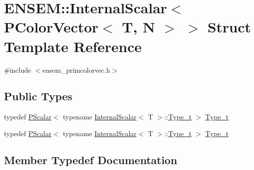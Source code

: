 \hypertarget{structENSEM_1_1InternalScalar_3_01PColorVector_3_01T_00_01N_01_4_01_4}{}\section{E\+N\+S\+EM\+:\+:Internal\+Scalar$<$ P\+Color\+Vector$<$ T, N $>$ $>$ Struct Template Reference}
\label{structENSEM_1_1InternalScalar_3_01PColorVector_3_01T_00_01N_01_4_01_4}


{\ttfamily \#include $<$ensem\+\_\+primcolorvec.\+h$>$}

\subsection*{Public Types}
\begin{DoxyCompactItemize}
\item 
typedef \mbox{\hyperlink{classENSEM_1_1PScalar}{P\+Scalar}}$<$ typename \mbox{\hyperlink{structENSEM_1_1InternalScalar}{Internal\+Scalar}}$<$ T $>$\+::\mbox{\hyperlink{structENSEM_1_1InternalScalar_3_01PColorVector_3_01T_00_01N_01_4_01_4_a24a574d9378f5b76122d29737f62fbfd}{Type\+\_\+t}} $>$ \mbox{\hyperlink{structENSEM_1_1InternalScalar_3_01PColorVector_3_01T_00_01N_01_4_01_4_a24a574d9378f5b76122d29737f62fbfd}{Type\+\_\+t}}
\item 
typedef \mbox{\hyperlink{classENSEM_1_1PScalar}{P\+Scalar}}$<$ typename \mbox{\hyperlink{structENSEM_1_1InternalScalar}{Internal\+Scalar}}$<$ T $>$\+::\mbox{\hyperlink{structENSEM_1_1InternalScalar_3_01PColorVector_3_01T_00_01N_01_4_01_4_a24a574d9378f5b76122d29737f62fbfd}{Type\+\_\+t}} $>$ \mbox{\hyperlink{structENSEM_1_1InternalScalar_3_01PColorVector_3_01T_00_01N_01_4_01_4_a24a574d9378f5b76122d29737f62fbfd}{Type\+\_\+t}}
\end{DoxyCompactItemize}


\subsection{Member Typedef Documentation}
\mbox{\label{structENSEM_1_1InternalScalar_3_01PColorVector_3_01T_00_01N_01_4_01_4_a24a574d9378f5b76122d29737f62fbfd}} 
